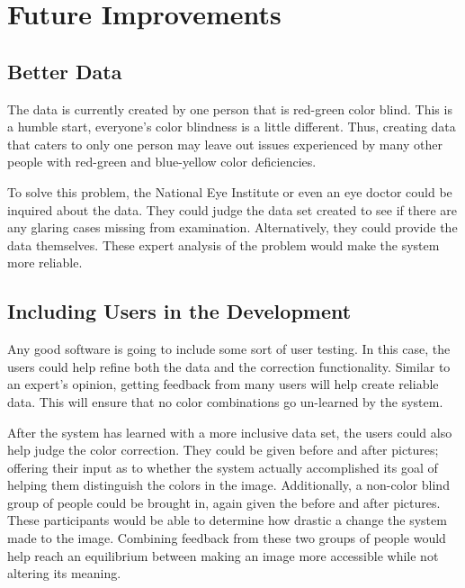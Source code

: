 \documentclass[12pt]{article}
\begin{document}
\section{Future Improvements}
\subsection{Better Data}
The data is currently created by one person that is red-green color blind. This is a humble start, everyone's color blindness is a little different. Thus, creating data that caters to only one person may leave out issues experienced by many other people with red-green and blue-yellow color deficiencies.

To solve this problem, the National Eye Institute or even an eye doctor could be inquired about the data. They could judge the data set created to see if there are any glaring cases missing from examination. Alternatively, they could provide the data themselves. These expert analysis of the problem would make the system more reliable.

\subsection{Including Users in the Development}
Any good software is going to include some sort of user testing. In this case, the users could help refine both the data and the correction functionality. Similar to an expert's opinion, getting feedback from many users will help create reliable data. This will ensure that no color combinations go un-learned by the system. 

After the system has learned with a more inclusive data set, the users could also help judge the color correction. They could be given before and after pictures; offering their input as to whether the system actually accomplished its goal of helping them distinguish the colors in the image. Additionally, a non-color blind group of people could be brought in, again given the before and after pictures. These participants would be able to determine how drastic a change the system made to the image. Combining feedback from these two groups of people would help reach an equilibrium between making an image more accessible while not altering its meaning.


\pagebreak
\end{document}
